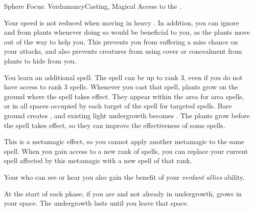   \begin{magicalfeat}{Sphere Focus: Verdamancy}{Casting, Magical}
    \featpre Access to the  .

     Your speed is not reduced when moving in heavy .
    In addition, you can ignore  and  from plants whenever doing so would be beneficial to you, as the plants move out of the way to help you.
    This prevents you from suffering a miss chance on your attacks, and also prevents creatures from using cover or concealment from plants to hide from you.

     You learn an additional spell.
    The spell can be up to rank 3, even if you do not have access to rank 3 spells.
    Whenever you cast that spell, plants  grow on the ground where the spell takes effect.
    They appear within the area for area spells, or in all spaces occupied by each target of the spell for targeted spells.
    Bare ground creates , and existing light undergrowth becomes .
    The plants grow before the spell takes effect, so they can improve the effectiveness of some  spells.

    This is a metamagic effect, so you cannot apply another metamagic to the same spell.
    When you gain access to a new rank of spells, you can replace your current spell affected by this metamagic with a new spell of that rank.

     Your  who can see or hear you also gain the benefit of your \textit{verdant allies} ability.

     At the start of each phase, if you are  and not already in undergrowth,  grows in your space.
    The undergrowth lasts until you leave that space.
  \end{magicalfeat}

